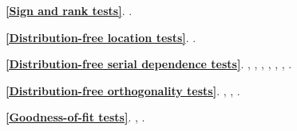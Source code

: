 \documentclass[titlepage,11pt,amstex]{article}
\begin{document}
\begin{description}
\item[\quad ] \textbf{\ref{Sign and rank tests}}. \cite%
{Dufour-Lepage-Zeidan(1982)}.

\item[\quad ] \textbf{\ref{Distribution-free location tests}}. \cite%
{Dufour-Hallin(1990)}.

\item[\quad ] \textbf{\ref{Distribution-free serial dependence tests}}. \cite%
{Dufour(1981)}, \cite{Dufour-Roy(1985)}, \cite{Dufour-Roy(1986)}, \cite%
{Dufour-Roy(1986b)}, \cite{Dufour-Hallin(1987)}, \cite%
{Dufour-Hallin-Mizera(1998)}, \cite{Dufour-Farhat-Hallin(2006)}.

\item[\quad ] \textbf{\ref{Distribution-free orthogonality tests}}. \cite%
{Campbell-Dufour(1991)}, \cite{Campbell-Dufour(1995)}, \cite%
{Campbell-Dufour(1997)}.

\item[\quad ] \textbf{\ref{Goodness-of-fit tests}}. \cite%
{Dufour-Farhat(2001)}, \cite{Dufour-Farhat(2001b)}.
\end{description}

\quad

\quad

\begin{comment}

\newpage \textbf{Bibliographie g\'{e}n\'{e}rale / General bibliography}

\begin{center}
\quad
\end{center}

\quad

\bbibunitu\bbibunit

\ebibunit\ebibunitu

\quad

\end{comment}

\newpage



\end{document}
